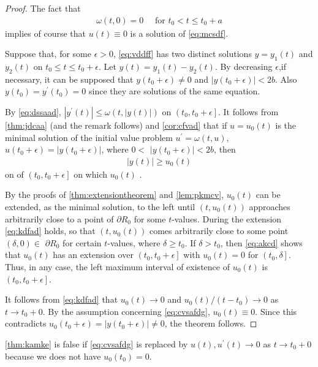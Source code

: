 \documentclass{article}
\begin{document}
\begin{proof}The fact that
\begin{align}
\omega(t, 0)=0 \quad \text { for } t_{0}<t \le t_{0}+a\label{eq:akcd}
\end{align}
implies of course that $u(t) \equiv 0$ is a solution of \cref{eq:mcsdf}.

Suppose that, for some $\epsilon>0$,   \cref{eq:vddff} has two distinct solutions $y=y_{1}(t)$ and $y_{2}(t)$ on $t_{0} \le t \le t_{0}+\epsilon$. { Let } $y(t)=y_{1}(t)-y_{2}(t)$. By decreasing $\epsilon$,if
necessary, it can be supposed that $y\left(t_{0}+\epsilon\right) \neq 0$ and $\left|y\left(t_{0}+\epsilon\right)\right|<2 b$. Also $y\left(t_{0}\right)=y^{\prime}\left(t_{0}\right)=0$ since they are solutions of the same equation. 

By \cref{eq:dssaad}, $\left|y^{\prime}(t)\right| \le \omega(t,|y(t)|)$ on $\left(t_{0}, t_{0}+\epsilon\right]$.  It follows from \cref{thm:jdcaa} (and the remark follows) and \cref{cor:cfvad} that if $u=u_{0}(t)$ is the minimal solution of the initial value problem $u^{\prime}=\omega(t, u)$, $u\left(t_{0}+\epsilon\right)=\left|y\left(t_{0}+\epsilon\right)\right|$, where $0<$ $\left|y\left(t_{0}+\epsilon\right)\right|<2 b$, then
\begin{align}
    |y(t)| \ge u_{0}(t)\label{eq:kdfad}
\end{align}
on  of $\left(t_{0}, t_{0}+\epsilon\right]$ on which $u_{0}(t)$ .

By the proofs of \cref{thm:extensiontheorem} and \cref{lem:pkmcv}, $u_{0}(t)$ can be extended, as the minimal solution, to the left until $\left(t, u_{0}(t)\right)$ approaches arbitrarily close to a point of $\partial R_{0}$ for some $t$-values. During the extension \cref{eq:kdfad} holds, so that $\left(t, u_{0}(t)\right)$ comes arbitrarily close to some point $(\delta, 0) \in$ $\partial R_{0}$ for certain $t$-values, where $\delta \ge t_{0}$. If $\delta>t_{0}$, then \cref{eq:akcd} shows that $u_{0}(t)$ has an extension over $\left(t_{0}, t_{0}+\epsilon\right]$ with $u_{0}(t)=0$ for $\left(t_{0}, \delta\right]$. Thus, in any case, the left maximum interval of existence of $u_{0}(t)$ is $\left(t_{0}, t_{0}+\epsilon\right]$.

It follows from \cref{eq:kdfad} that $u_{0}(t) \rightarrow 0$ and $u_{0}(t) /\left(t-t_{0}\right) \rightarrow 0$ as $t \rightarrow t_{0}+0$. 
By the assumption concerning \cref{eq:cvsafdg}, $u_{0}(t) \equiv 0$. Since this contradicts $u_{0}\left(t_{0}+\epsilon\right)=\left|y\left(t_{0}+\epsilon\right)\right| \neq 0$, the theorem follows.
\end{proof}
\begin{rema}
\cref{thm:kamke} is false if \cref{eq:cvsafdg} is replaced by $u(t), u^{\prime}(t) \rightarrow 0$ as $t \rightarrow t_{0}+0$ because we does not have $u_0(t_0)=0$.
\end{rema}
\end{document}
